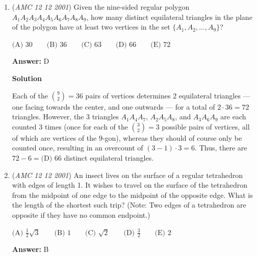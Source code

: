 \begin{enumerate}
 $\text{(A) }2b \qquad \text{(B) }2c \qquad \text{(C) }2a+2b \qquad \text{(D) }2h \qquad \text{(E) }2k$

 \textbf{Answer: }E



\textbf{Solution}

We write $p(x)$ as $a(x-h)^2+k$ (this is possible for any parabola). Then the reflection of $p(x)$ is $q(x) = -a(x-h)^2+k$. Then we find $p(x) + q(x) = 2k$. Since $p(1) = a+b+c$ and $q(1) = d+e+f$, we have $a+b+c+d+e+f = 2k$, so the answer is $\fbox{E}$.

 


	\item (\textit{AMC 12 12 2001}) Given the nine-sided regular polygon $A_1 A_2 A_3 A_4 A_5 A_6 A_7 A_8 A_9$, how many distinct equilateral triangles in the plane of the polygon have at least two vertices in the set $\{A_1,A_2,\dots,A_9\}$?


 $\text{(A) }30 \qquad \text{(B) }36 \qquad \text{(C) }63 \qquad \text{(D) }66 \qquad \text{(E) }72$

 \textbf{Answer: }D



\textbf{Solution}

Each of the $\binom{9}{2} = 36$ pairs of vertices determines $2$ equilateral triangles — one facing towards the center, and one outwards — for a total of $2 \cdot 36 = 72$ triangles. However, the $3$ triangles $A_1A_4A_7$, $A_2A_5A_8$, and $A_3A_6A_9$ are each counted $3$ times (once for each of the $\binom{3}{2} = 3$ possible pairs of vertices, all of which are vertices of the $9$-gon), whereas they should of course only be counted once, resulting in an overcount of $(3-1) \cdot 3 = 6$. Thus, there are $72-6 = \boxed{\text{(D) }66}$ distinct equilateral triangles.

 


	\item (\textit{AMC 12 12 2001}) An insect lives on the surface of a regular tetrahedron with edges of length 1. It wishes to travel on the surface of the tetrahedron from the midpoint of one edge to the midpoint of the opposite edge. What is the length of the shortest such trip? (Note: Two edges of a tetrahedron are opposite if they have no common endpoint.)


 $\text{(A) }\frac {1}{2} \sqrt {3} \qquad \text{(B) }1 \qquad \text{(C) }\sqrt {2} \qquad \text{(D) }\frac {3}{2} \qquad \text{(E) }2$

 \textbf{Answer: }B




\end{enumerate}
